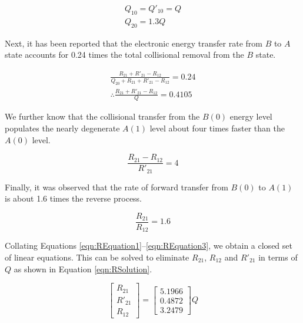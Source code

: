 \begin{gather}
  Q_{10} = Q'_{10} = Q
  \label{eqn:quenchingAssumption1}\\
  Q_{20} = 1.3Q
  \label{eqn:quenchingAssumption2}
\end{gather}

Next, it has been reported\cite{2000-luque} that the electronic energy transfer rate from \(B\) to \(A\) state accounts for 0.24 times the total collisional removal from the \(B\) state.

\begin{gather}
  \frac{ R_{21} + R'_{21} - R_{12} }{ Q_{20} + R_{21} + R'_{21} - R_{12} } = 0.24\\
  \therefore \frac{ R_{21} + R'_{21} - R_{12} }{ Q } = 0.4105
  \label{eqn:REquation1}
\end{gather}

We further know\cite{1985-garland-b, 2000-luque} that the collisional transfer from the \(B(0)\) energy level populates the nearly degenerate \(A(1)\) level about four times faster than the \(A(0)\) level.

\begin{equation}
  \frac{ R_{21} - R_{12} }{ R'_{21} } = 4
  \label{eqn:REquation2}
\end{equation}

Finally, it was observed\cite{1985-garland-b} that the rate of forward transfer from \(B(0)\) to \(A(1)\) is about 1.6 times the reverse process.

\begin{equation}
  \frac{R_{21}}{R_{12}} = 1.6
  \label{eqn:REquation3}
\end{equation}

Collating Equations \ref{eqn:REquation1}--\ref{eqn:REquation3}, we obtain a closed set of linear equations.
This can be solved to eliminate \(R_{21}\), \(R_{12}\) and \(R'_{21}\) in terms of \(Q\) as shown in Equation \ref{eqn:RSolution}.

\begin{equation}
  \left[
    \begin{matrix}
      R_{21}\\
      R'_{21}\\
      R_{12}
    \end{matrix}
  \right] = \left[
    \begin{matrix}
      5.1966\\
      0.4872\\
      3.2479
    \end{matrix}
  \right] Q
  \label{eqn:RSolution}
\end{equation}

